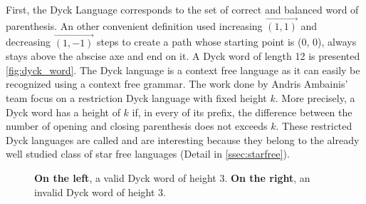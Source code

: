 First, the Dyck Language corresponds to the set of correct and balanced word  of parenthesis.
An other convenient definition used increasing $\overrightarrow{ (1,1)}$ and decreasing
$\overrightarrow{ (1,-1)}$ steps to create a path whose starting point is (0, 0), always
stays above the abscise axe and end on it. A Dyck word of length 12 is presented \autoref{fig:dyck_word}.
The Dyck language is a context free language as it can easily be recognized using a context
free grammar. The work done by Andris Ambainis' team \cite{art:2DGrid} focus on a restriction
Dyck language with fixed height $k$. More precisely, a Dyck word has a height of $k$ if, in every
of its prefix, the difference between the number of opening and closing parenthesis does not
exceeds $k$. These restricted Dyck languages are called  and are interesting because
they belong to the already well studied class of star free languages (Detail in \autoref{ssec:starfree}).

\begin{figure}[h!]
    \centering
    \caption{\textbf{On the left}, a valid Dyck word of height 3. \textbf{On the right}, an invalid Dyck word of height 3.}
    \label{fig:dyck_word}
\end{figure}

